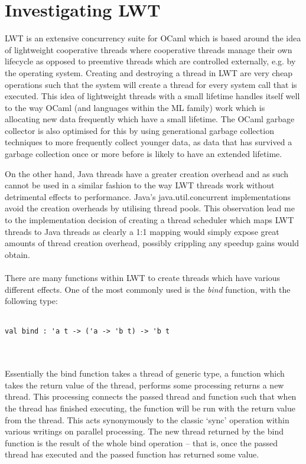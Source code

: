 \documentclass[12pt,twoside,notitlepage]{report}
\begin{document}
\section{Investigating LWT}
\label{sec:investigating_lwt}
%
%
LWT is an extensive concurrency suite for OCaml which is based around the idea of lightweight cooperative threads\cite{dimino2012} where cooperative threads manage their own lifecycle as opposed to preemtive threads which are
controlled externally, e.g. by the operating system. Creating and destroying a thread in LWT are very cheap operations such that the system will create a thread for every system call that is executed. This idea of lightweight threads
with a small lifetime handles itself well to the way OCaml (and languages within the ML family) work which is allocating new data frequently which have a small lifetime. The OCaml garbage collector is also optimised for this by using
generational garbage collection techniques to more frequently collect younger data, as data that has survived a garbage collection once or more before is likely to have an extended lifetime.\cite{chailloux2000}

On the other hand, Java threads have a greater creation overhead and as such cannot be used in a similar fashion to the way LWT threads work without detrimental effects to performance. Java's java.util.concurrent implementations avoid
the creation overheads by utilising thread pools\cite{web:threadpools}. This observation lead me to the implementation decision of creating a thread scheduler which maps LWT threads to Java threads as clearly a 1:1 mapping would
simply expose great amounts of thread creation overhead, possibly crippling any speedup gains would obtain.
\\
\\
%
%
There are many functions within LWT to create threads which have various different effects. One of the most commonly used is the {\em bind} function, with the following type:
\\
\\
\begin{lstlisting}[frame=single]
val bind : 'a t -> ('a -> 'b t) -> 'b t
\end{lstlisting}
\\
\\
Essentially the bind function takes a thread of generic type, a function which takes the return value of the thread, performs some processing returns a new thread. This processing connects the passed thread and function such that when
the thread has finished executing, the function will be run with the return value from the thread. This acts synonymously to the classic `sync' operation within various writings on parallel processing\cite{cormen2009}. The new thread
returned by the bind function is the result of the whole bind operation -- that is, once the passed thread has executed and the passed function has returned some value.
\end{document}
